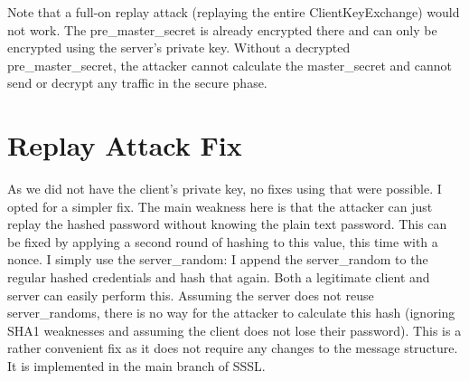 \documentclass{article}
\begin{document}
Note that a full-on replay attack (replaying the entire ClientKeyExchange) would not work. The pre\_master\_secret is already encrypted there and can only be encrypted using the server's private key. Without a decrypted pre\_master\_secret, the attacker cannot calculate the master\_secret and cannot send or decrypt any traffic in the secure phase.


\section{Replay Attack Fix}
As we did not have the client's private key, no fixes using that were possible. I opted for a simpler fix. The main weakness here is that the attacker can just replay the hashed password without knowing the plain text password. This can be fixed by applying a second round of hashing to this value, this time with a nonce. I simply use the server\_random: I append the server\_random to the regular hashed credentials and hash that again. Both a legitimate client and server can easily perform this. Assuming the server does not reuse server\_randoms, there is no way for the attacker to calculate this hash (ignoring SHA1 weaknesses and assuming the client does not lose their password). This is a rather convenient fix as it does not require any changes to the message structure. It is implemented in the main branch of SSSL.
\end{document}
